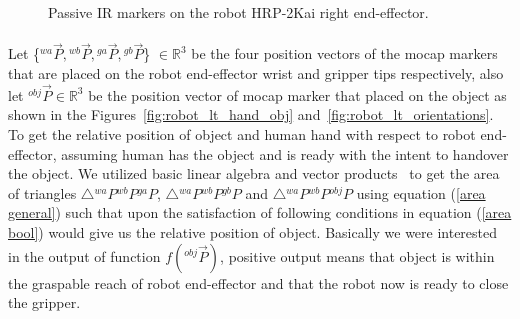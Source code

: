 \documentclass[a4paper, 12pt, oneside]{Thesis}  %
\begin{document}
\begin{figure}[ht]
	\caption{Passive IR markers on the robot HRP-2Kai right end-effector.}
	\label{fig:markerEf}
\end{figure} 

\paragraph*{}
Let \{${}^{wa}\vec P, {}^{wb}\vec P, {}^{ga}\vec P, {}^{gb}\vec P$\} $\in \mathbb{R}^{3}$ be the four position vectors of the mocap markers that are placed on the robot end-effector wrist and gripper tips respectively, also let ${}^{obj}\vec P\in \mathbb{R}^{3}$ be the position vector of mocap marker that placed on the object as shown in the Figures~\ref{fig:robot_lt_hand_obj} and~\ref{fig:robot_lt_orientations}. To get the relative position of object and human hand with respect to robot end-effector, assuming human has the object and is ready with the intent to handover the object. We utilized basic linear algebra and vector products~\cite{brand1947vector, wiki:vector, wiki:algebra} to get the area of triangles $\triangle{{}^{wa}P {}^{wb}P {}^{ga}P}$, $\triangle{{}^{wa}P {}^{wb}P {}^{gb}P}$ and $\triangle{{}^{wa}P {}^{wb}P {}^{obj}P}$ using equation (\ref{area general}) such that upon the satisfaction of following conditions in equation (\ref{area bool}) would give us the relative position of object. Basically we were interested in the output of function $f({}^{obj}\vec{P})$, positive output means that object is within the graspable reach of robot end-effector and that the robot now is ready to close the gripper.
\end{document}
